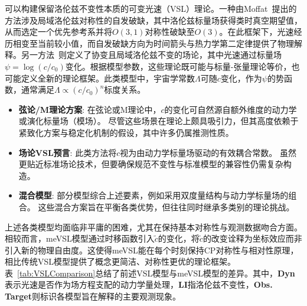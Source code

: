\documentclass[jkps,preprint,fleqn]{revtex4}
\newcommand{\tc}{\tilde{c}}
\begin{document}
\begin{CJK*}{UTF8}{gbsn}
\begin{itemize}
\end{itemize}
可以构建保留洛伦兹不变性本质的可变光速（VSL）理论。一种由Moffat~\cite{Moffat:1992ud}提出的方法涉及局域洛伦兹对称性的自发破缺，其中洛伦兹标量场获得类时真空期望值，从而选定一个优先参考系并将$O(3,1)$对称性破缺至$O(3)$。在此框架下，光速经历相变至当前较小值，而自发破缺方向为时间箭头与热力学第二定律提供了物理解释。另一方法~\cite{Magueijo:2000zt}则定义了协变且局域洛伦兹不变的场论，其中光速通过标量场$\psi = \log(c/c_0)$变化。根据模型参数，这些理论既可能与标量-张量理论等价，也可能定义全新的理论框架。此类模型中，宇宙学常数$\Lambda$可随$c$变化，作为$\psi$的势函数，通常满足$\Lambda \propto (c/c_0)^n$标度关系\cite{Manida:1999rx,Barrow:1999st,Stepanov:1999ax,Magueijo:2000au,Moffat:2002nm}。

\begin{itemize}
  \item \textbf{弦论/M理论方案}:
    在弦论或M理论中，$c$的变化可自然源自额外维度的动力学或演化标量场（模场）\cite{Kaelbermann:1998hu,Randall:1999ee,Randall:1999vf,Kiritsis:1999tx,Chung:1999xg,Alexander:1999cb,Ishihara:2000nf,Csaki:2000dm,Youm:2001sw,Youm:2001zk,Grojean:2001pv,Youm:2001zp}。
    尽管这些场景在理论上颇具吸引力，但其高度依赖于紧致化方案与稳定化机制的假设，其中许多仍属推测性质。
   \item \textbf{场论VSL预言}:
    此类方法将$c$视为由动力学标量场驱动的有效耦合常数\cite{Drummond:1979pp,Novello:1988ma,Barton:1989dq,Scharnhorst:1990sr,Shore:1995fz,Colladay:1995qb,Coleman:1998ti,Bertolami:1999da,Shore:2000bs,Greenberg:2002uu,Teyssandier:2003qh,Shore:2003zc,Blasone:2003wf}。
    虽然更贴近标准场论技术，但要确保规范不变性与标准模型的兼容性仍需复杂构造。
    \item \textbf{混合模型}:
    部分模型综合上述要素，例如采用双度量结构与动力学标量场的组合\cite{Alexander:2001dr,Burgess:2002tb}。
    这些混合方案旨在平衡各类优势，但往往同时继承多类别的理论挑战。
\end{itemize}

上述各类模型均面临非平庸的困难，尤其在保持基本对称性与观测数据吻合方面。相较而言，meVSL模型通过时移函数引入$\tc$的变化，将$\tc$的改变诠释为坐标效应而非引入新的物理自由度。这使得meVSL能在每个时刻保持CP对称性与相对性原理，相比传统VSL模型提供了概念更简洁、对称性更优的理论框架。表~\ref{tab:VSLComparison}总结了前述VSL模型与meVSL模型的差异。其中，\textbf{Dyn}表示光速是否作为场方程支配的动力学量处理，\textbf{LI}指洛伦兹不变性，\textbf{Obs. Target}则标识各模型旨在解释的主要观测现象。

\end{CJK*}
\end{document}
